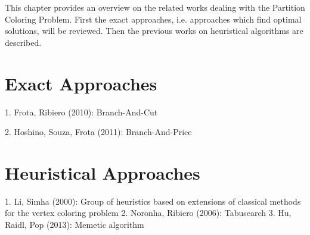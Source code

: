 This chapter provides an overview on the related works dealing with the Partition Coloring Problem. First the exact approaches, i.e. approaches which find optimal solutions, will be reviewed. Then the previous works on heuristical algorithms are described. 

\section{Exact Approaches}

1. Frota, Ribiero (2010): Branch-And-Cut


2. Hoshino, Souza, Frota (2011): Branch-And-Price


\section{Heuristical Approaches}

1. Li, Simha (2000): Group of heuristics based on extensions of
classical methods for the vertex coloring problem
2. Noronha, Ribiero (2006): Tabusearch
3. Hu, Raidl, Pop (2013): Memetic algorithm
